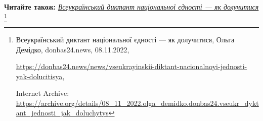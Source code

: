  
 
 
 
 


\textbf{Читайте також:} \href{https://archive.org/details/08_11_2022.olga_demidko.donbas24.vseukr_dyktant_jednosti_jak_doluchytys}{\emph{Всеукраїнський диктант національної єдності — як долучитися}}%
\footnote{Всеукраїнський диктант національної єдності — як долучитися, Ольга Демідко, donbas24.news, 08.11.2022, \par%
\url{https://donbas24.news/news/vseukrayinskii-diktant-nacionalnoyi-jednosti-yak-dolucitisya}, \par%
Internet Archive: \url{https://archive.org/details/08_11_2022.olga_demidko.donbas24.vseukr_dyktant_jednosti_jak_doluchytys}%
}

